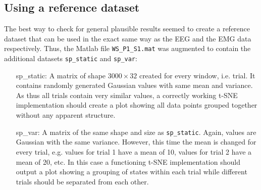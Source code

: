 \documentclass{article} %
\begin{document}
\subsection{Using a reference dataset}
The best way to check for general plausible results seemed to create a reference dataset that can be used in the exact same way as the EEG and the EMG data respectively. Thus, the Matlab file \verb|WS_P1_S1.mat| was augmented to contain the additional datasets \verb|sp_static| and \verb|sp_var|:


\begin{itemize}	
	\item[sp\_static:]  A matrix of shape $3000\times32$ created for every window, i.e. trial. It contains randomly generated Gaussian values with same mean and variance. As thus all trials contain very similar values, a correctly working t-SNE implementation should create a plot showing all data points grouped together without any apparent structure.
	\item[sp\_var:]  A matrix of the same shape and size as \verb|sp_static|. Again, values are Gaussian with the same variance. However, this time the mean is changed for every trial, e.g. values for trial 1 have a mean of 10, values for trial 2 have a mean of 20, etc. In this case a functioning t-SNE implementation should output a plot showing a grouping of states within each trial while different trials should be separated from each other.
\end{itemize}
\end{document}
